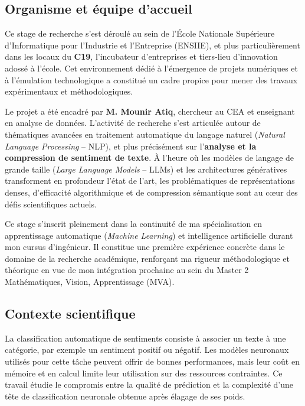 
\subsection{Organisme et équipe d'accueil}
\label{ssec:introduction_organisme}

Ce stage de recherche s'est déroulé au sein de l'École Nationale Supérieure d'Informatique pour l'Industrie et l'Entreprise (\textsc{ENSIIE}), et plus particulièrement dans les locaux du \textbf{C19}, l'incubateur d'entreprises et tiers-lieu d'innovation adossé à l'école. Cet environnement dédié à l'émergence de projets numériques et à l'émulation technologique a constitué un cadre propice pour mener des travaux expérimentaux et méthodologiques.

Le projet a été encadré par \textbf{M. Mounir Atiq}, chercheur au CEA et enseignant en analyse de données. L'activité de recherche s'est articulée autour de thématiques avancées en traitement automatique du langage naturel (\textit{Natural Language Processing} -- NLP), et plus précisément sur l'\textbf{analyse et la compression de sentiment de texte}. À l'heure où les modèles de langage de grande taille (\textit{Large Language Models} -- LLMs) et les architectures génératives transforment en profondeur l'état de l'art, les problématiques de représentations denses, d'efficacité algorithmique et de compression sémantique sont au cœur des défis scientifiques actuels.

Ce stage s'inscrit pleinement dans la continuité de ma spécialisation en apprentissage automatique (\textit{Machine Learning}) et intelligence artificielle durant mon cursus d'ingénieur. Il constitue une première expérience concrète dans le domaine de la recherche académique, renforçant ma rigueur méthodologique et théorique en vue de mon intégration prochaine au sein du Master 2 Mathématiques, Vision, Apprentissage (MVA).
\subsection{Contexte scientifique}
\label{ssec:introduction_contexte_scientifique}

La classification automatique de sentiments consiste à associer un texte à une
catégorie, par exemple un sentiment positif ou négatif. Les modèles neuronaux
utilisés pour cette tâche peuvent offrir de bonnes performances, mais leur coût
en mémoire et en calcul limite leur utilisation sur des ressources contraintes.
Ce travail étudie le compromis entre la qualité de prédiction et la complexité
d'une tête de classification neuronale obtenue après élagage de ses poids.

